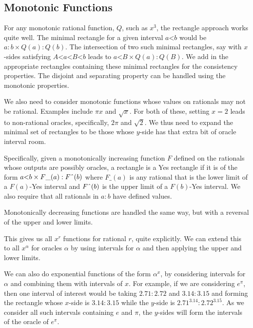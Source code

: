 \documentclass[12pt]{article}
\theoremstyle{remark}
\newcommand{\lt}{\mathord{<}}
\begin{document}
\subsection{Monotonic Functions}

For any monotonic rational function, $Q$, such as $x^3$, the rectangle approach works quite well. The minimal rectangle for a given interval $a \lt b$ would be $a:b \times Q(a):Q(b)$. The intersection of two such minimal rectangles, say with $x$-sides satisfying $A \lt a \lt B \lt b$ leads to $a \lt B  \times  Q(a):Q(B) $. We add in the appropriate rectangles containing these minimal rectangles for the consistency properties. The disjoint and separating property can be handled using the monotonic properties. 

We also need to consider monotonic functions whose values on rationals may not be rational. Examples include $\pi x$ and $\sqrt{x}$. For both of these, setting $x=2$ leads to non-rational oracles, specifically, $2 \pi$ and $\sqrt{2}$. We thus need to expand the minimal set of rectangles to be those whose $y$-side has that extra bit of oracle interval room. 

Specifically, given a monotonically increasing function $F$ defined on the rationals whose outputs are possibly oracles, a rectangle is a Yes rectangle if it is of the form  $a \lt b \times F\_(a):F\string^ (b)$  where $F\_(a)$ is any rational that is the lower limit of a $F(a)$-Yes interval and $F\string^ (b)$ is the upper limit of a $F(b)$-Yes interval. We also require that all rationals in $a:b$ have defined values. 

Monotonically decreasing functions are handled the same way, but with a reversal of the upper and lower limits. 

This gives us all $x^r$ functions for rational $r$, quite explicitly. We can extend this to all $x^{\alpha}$ for oracles $\alpha$ by using intervals for $\alpha$ and then applying the upper and lower limits. 

We can also do exponential functions of the form $\alpha^{x}$, by considering intervals for $\alpha$ and combining them with intervals of $x$. For example, if we are considering $e^{\pi}$, then one interval of interest would be taking $2.71:2.72$ and $3.14:3.15$ and forming the rectangle whose $x$-side is $3.14:3.15$ while the $y$-side is $2.71^{3.14}:2.72^{3.15}$. As we consider all such intervals containing $e$ and $\pi$, the $y$-sides will form the intervals of the oracle of $e^{\pi}$.
\end{document}
